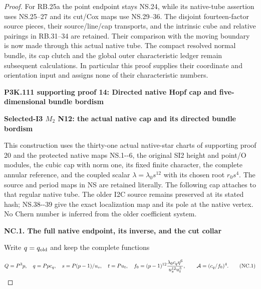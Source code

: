 \begin{proof}
For RB.25a the point endpoint stays NS.24, while its native-tube
assertion uses NS.25--27 and its cut/Cox maps use NS.29--36. The disjoint
fourteen-factor source pieces, their source/line/cap transports, and
the intrinsic cube and relative pairings in RB.31--34 are retained.
Their comparison with the moving boundary is now made through this
actual native tube. The compact resolved normal bundle, its cap
clutch and the global outer characteristic ledger remain subsequent
calculations. In particular this proof supplies their coordinate and
orientation input and assigns none of their characteristic numbers.




\par\bigskip\noindent\textbf{P3K.111 supporting proof 14: Directed native Hopf cap and five-dimensional bundle bordism}\par\nobreak
\par

\medskip\noindent\textbf{Selected-I3 \(M_{2}\) N12: the actual native cap and its directed bundle bordism}

\par\nobreak

This construction uses the thirty-one actual native-star charts of supporting proof 20 and the protected native maps NS.1-\/-6,
the original SI2 height and point/O modules, the cubic cap with norm
one, its fixed finite character, the complete annular reference, and
the coupled scalar \(\lambda=\lambda_0 s^{12}\) with its chosen root \(r_{0} s^{4}\).
The source and period maps in NS are retained literally. The following
cap attaches to that regular native tube. The older I2C source remains
preserved at its stated hash; NS.38-\/-39 give the exact localization map
and its pole at the native vertex. No Chern number is inferred from
the older coefficient system.

\par

\medskip\noindent\textbf{NC.1. The full native endpoint, its inverse, and the cut collar}

\par\nobreak

Write \(q=q_{\rm old}\) and keep the complete functions

\[
 Q=P^3p,\quad q=Pp c_q,\quad
 s=P(p-1)/u_s,\quad t=Pu_t,\quad
 f_0=(p-1)^{12}\frac{\lambda_0c_q\eta^6}{u_s^{12}u_t^3},
 \qquad {\cal A}=(c_q/f_0)^4.                       \tag{NC.1}
\]


\end{proof}
